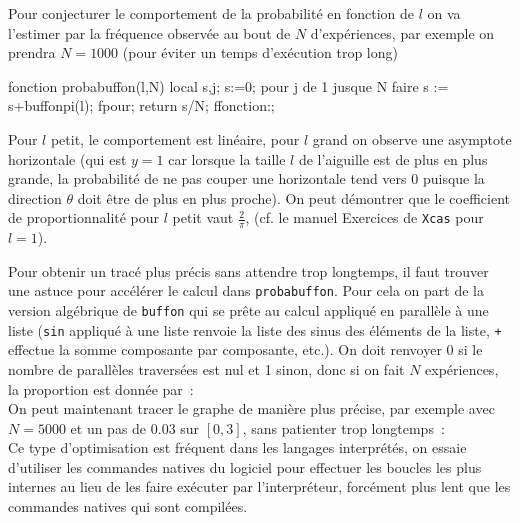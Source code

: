 \documentclass[12pt,a4paper]{book}
\begin{document}
\begin{giacjshere}
Pour conjecturer le comportement de la probabilit\'e en fonction de $l$
on va l'estimer par la fr\'equence observ\'ee au bout de $N$
d'exp\'eriences, par exemple on prendra $N=1000$ (pour \'eviter
un temps d'ex\'ecution trop long)
\begin{giaconload}
fonction probabuffon(l,N)
  local s,j;
  s:=0;
  pour j de 1 jusque N faire
    s := s+buffonpi(l);
  fpour;
  return s/N;
ffonction:;
\end{giaconload}
Pour $l$ petit, le comportement est lin\'eaire, pour $l$ grand
on observe une asymptote horizontale (qui est $y=1$ car lorsque
la taille $l$ de l'aiguille est de plus en plus grande,
la probabilit\'e de ne pas couper une horizontale tend vers 0
puisque la direction $\theta$ doit \^etre de plus en plus proche). 
On peut d\'emontrer que
le coefficient de proportionnalit\'e pour $l$ petit vaut $\frac{2}{\pi}$,
(cf. le manuel Exercices de {\tt Xcas} pour $l=1$).

Pour obtenir un trac\'e plus pr\'ecis sans attendre trop longtemps,
il faut trouver une astuce pour acc\'el\'erer le calcul dans
\verb|probabuffon|.
Pour cela on part de la version alg\'ebrique de \verb|buffon| qui
se pr\^ete au calcul appliqu\'e en parall\`ele \`a une liste
(\verb|sin| appliqu\'e \`a une liste renvoie la liste des sinus
des \'el\'ements de la liste, \verb|+| effectue la somme composante
par composante, etc.).
On doit renvoyer 0 si 
le nombre de parall\`eles travers\'ees
est nul et 1 sinon, donc si on fait $N$ exp\'eriences,
la proportion est donn\'ee par~:\\
On peut maintenant tracer le graphe de mani\`ere plus pr\'ecise,
par exemple avec $N=5000$ et un pas de 0.03 sur $[0,3]$, sans patienter
trop longtemps~:\\
Ce type d'optimisation est fr\'equent dans les langages interpr\'et\'es,
on essaie d'utiliser les commandes natives du logiciel pour effectuer
les boucles les plus internes au lieu de les faire ex\'ecuter par
l'interpr\'eteur, forc\'ement plus lent que les commandes natives qui
sont compil\'ees.


\end{giacjshere}
\end{document}
